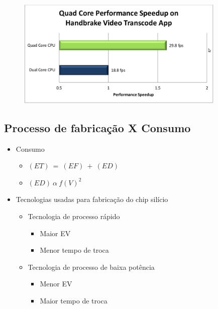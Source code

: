 \documentclass{beamer}
\begin{document}
\begin{frame}
  \begin{figure}[ht]
    \centering
    \includegraphics[width=10.0cm]{./pictures/QuadCoreVideo.png}
  \end{figure}
\end{frame}
    
    
\subsection{Processo de fabrica\c{c}\~ao X Consumo}
 \begin{frame}
  \begin{itemize}
    \item Consumo
    \begin{itemize}
      \item \( (ET)\ =\ (EF)\ +\ (ED) \)
      \item \( (ED)\  \alpha\  f(V)^2\)
    \end{itemize}
  \end{itemize}
\end{frame}
  
\begin{frame}
  \begin{itemize}
    \item Tecnologias usadas para fabrica\c{c}\~ao do chip sil\'icio
    \begin{itemize}
      \item Tecnologia de processo r\'apido
      \begin{itemize}
	\item Maior EV
	\item Menor tempo de troca
      \end{itemize}
    \end{itemize}
    \begin{itemize}
      \item Tecnologia de processo de baixa pot\^encia
      \begin{itemize}
	\item Menor EV
	\item Maior tempo de troca
      \end{itemize}
    \end{itemize}
  \end{itemize}
\end{frame}
\end{document}
